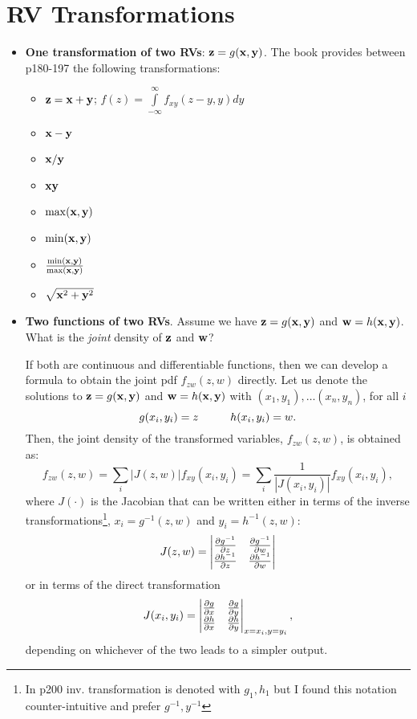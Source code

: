 \documentclass[a4paper, oneside]{book}
\begin{document}
\section{RV Transformations}
\label{sec:two_rv_transformations}
\begin{itemize}
\item \textbf{One transformation of two RVs}: $\mathbf z = g(\mathbf{x,y})$. The book provides between p180-197 the following transformations:
	\begin{itemize}
	\item $\mathbf z = \mathbf{x+y}$; $f(z) = \int\limits_{-\infty}^\infty f_{xy}(z-y, y)dy$
	\item $\mathbf{x-y}$
	\item $\mathbf{x/y}$
	\item $\mathbf{xy}$
	\item $\max(\mathbf{x,y})$
	\item $\min(\mathbf{x,y})$
	\item $\frac{\min(\mathbf{x,y})}{\max(\mathbf{x,y})}$
	\item $\sqrt{\mathbf x^2 + \mathbf y^2}$
	\end{itemize}
\item \textbf{Two functions of two RVs}. Assume we have $\mathbf z = g(\mathbf{x,y})$ and $\mathbf w  = h(\mathbf{x,y})$. What is the \textit{joint} density of $\mathbf z$ and $\mathbf w$?

If both are continuous and differentiable functions, then we can develop a formula to obtain the joint pdf $f_{zw} (z,w)$ directly. Let us denote the solutions to $\mathbf z = g(\mathbf{x,y})$ and $\mathbf w  = h(\mathbf{x,y})$ with $(x_1,y_1), \hdots (x_n,y_n)$, \ie for all $i$%
$$g(x_i,y_i) = z\hspace{1truecm} h(x_i,y_i) = w.$$
%
Then, the joint density of the transformed variables, $f_{zw}(z,w)$, is obtained as:%
\begin{equation}
f_{zw}(z,w) = \sum_{i}|J(z,w)|f_{xy}(x_i,y_i) = \sum_{i}\frac{1}{|J(x_i,y_i)|}f_{xy}(x_i,y_i),
\label{eq:two_rv_transformation}
\end{equation}
where $J(\cdot)$ is the Jacobian that can be written either in terms of the inverse transformations\footnote{In p200 inv. transformation is denoted with $g_1,h_1$ but I found this notation counter-intuitive and prefer $g^{-1}, y^{-1}$}, $x_i = g^{-1}(z,w)$ and $y_i = h^{-1}(z,w)$:
\begin{equation}
J(z,w) = \left| \begin{matrix}
\frac{\partial g^{-1}}{\partial z} & \frac{\partial g^{-1}}{\partial w} \\
\frac{\partial h^{-1}}{\partial z} & \frac{\partial h^{-1}}{\partial w}
\end{matrix} \right|
\label{eq:j_inverse}
\end{equation}
%
or in terms of the direct transformation
%
\begin{equation}
J(x_i,y_i) = \left| \begin{matrix}
\frac{\partial g}{\partial x} & \frac{\partial g}{\partial y} \\
\frac{\partial h}{\partial x} & \frac{\partial h}{\partial y}
\end{matrix} \right|_{x=x_i,y=y_i},
\label{eq:j_direct}
\end{equation}
depending on whichever of the two leads to a simpler output.


\end{itemize}
\end{document}
